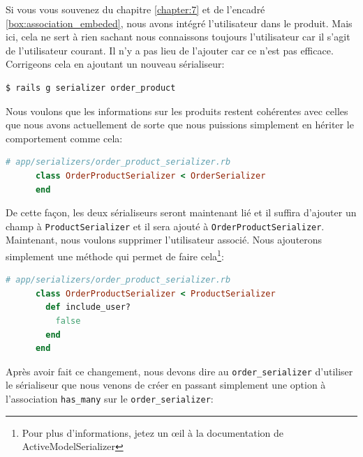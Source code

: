 \documentclass[]{report}
\begin{document}
    Si vous vous souvenez du chapitre \ref{chapter:7} et de l'encadré \ref{box:association_embeded}, nous avons intégré l'utilisateur dans le produit. Mais ici, cela ne sert à rien sachant nous connaissons toujours l'utilisateur car il s'agit de l'utilisateur courant. Il n'y a pas lieu de l'ajouter car ce n'est pas efficace. Corrigeons cela en ajoutant un nouveau sérialiseur:

    \begin{scriptsize}
      \begin{lstlisting}[language=bash]
      $ rails g serializer order_product
      \end{lstlisting}
    \end{scriptsize}

    Nous voulons que les informations sur les produits restent cohérentes avec celles que nous avons actuellement de sorte que nous puissions simplement en hériter le comportement comme cela:

    \begin{scriptsize}
      \begin{lstlisting}[language=ruby]
      # app/serializers/order_product_serializer.rb
      class OrderProductSerializer < OrderSerializer
      end
      \end{lstlisting}
    \end{scriptsize}

    De cette façon, les deux sérialiseurs seront maintenant lié et il suffira d'ajouter un champ à \verb|ProductSerializer| et il sera ajouté à \verb|OrderProductSerializer|. Maintenant, nous voulons supprimer l'utilisateur associé. Nous ajouterons simplement une méthode qui permet de faire cela\footnote{Pour plus d'informations, jetez un œil à la documentation de  ActiveModelSerializer}:

    \begin{scriptsize}
      \begin{lstlisting}[language=ruby]
      # app/serializers/order_product_serializer.rb
      class OrderProductSerializer < ProductSerializer
        def include_user?
          false
        end
      end
      \end{lstlisting}
    \end{scriptsize}

    Après avoir fait ce changement, nous devons dire au \verb|order_serializer| d'utiliser le sérialiseur que nous venons de créer en passant simplement une option à l'association \verb|has_many| sur le \verb|order_serializer|:
\end{document}
